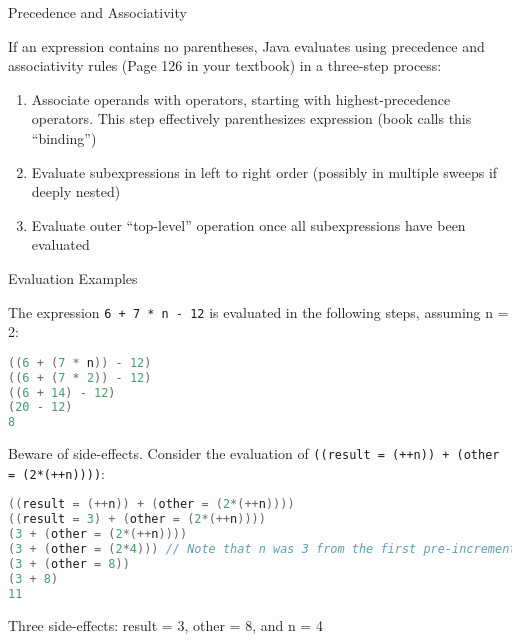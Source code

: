 \documentclass{beamer}
\begin{document}
\begin{frame}[fragile]{Precedence and Associativity}


If an expression contains no parentheses, Java evaluates using precedence and associativity rules (Page 126 in your textbook) in a three-step process:
\begin{enumerate}
\item Associate operands with operators, starting with highest-precedence operators.  This step effectively parenthesizes expression (book calls this ``binding'')
\item Evaluate subexpressions in left to right order (possibly in multiple sweeps if deeply nested)
\item Evaluate outer ``top-level'' operation once all subexpressions have been evaluated
\end{enumerate}


\end{frame}

\begin{frame}[fragile]{Evaluation Examples}


The expression {\tt 6 + 7 * n - 12} is evaluated in the following steps, assuming n = 2:
\begin{lstlisting}[language=Java]
((6 + (7 * n)) - 12)
((6 + (7 * 2)) - 12)
((6 + 14) - 12)
(20 - 12)
8
\end{lstlisting}
\vspace{-.1in}
Beware of side-effects.  Consider the evaluation of {\tt ((result = (++n)) + (other = (2*(++n))))}:
\begin{lstlisting}[language=Java]
((result = (++n)) + (other = (2*(++n))))
((result = 3) + (other = (2*(++n))))
(3 + (other = (2*(++n))))
(3 + (other = (2*4))) // Note that n was 3 from the first pre-increment
(3 + (other = 8))
(3 + 8)
11
\end{lstlisting}
\vspace{-.1in}
Three side-effects: result = 3, other = 8, and n = 4

\end{frame}







\end{document}
